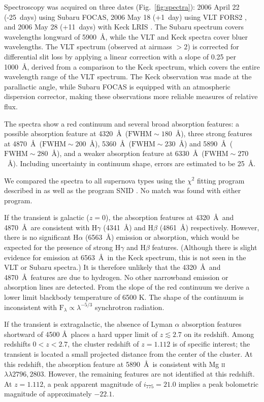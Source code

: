 Spectroscopy was acquired on three dates (Fig.~\ref{fig:spectra}): 
2006 April 22 (-25~days) using Subaru FOCAS, 
2006 May 18 (+1~day) using VLT FORS2 \citep{appenzeller98a}, and 
2006 May 28 (+11~days) with Keck LRIS \citep{oke95a}.
The Subaru spectrum covers wavelengths longward of 5900~\AA, 
while the VLT and Keck spectra cover bluer wavelengths.
The VLT spectrum (observed at airmass $> 2$) is corrected for differential 
slit loss by applying a linear correction with a slope of 0.25 per 1000~\AA, 
derived from a comparison to the Keck spectrum, which covers the 
entire wavelength range of the VLT spectrum.
The Keck observation was made at the parallactic angle, 
while Subaru FOCAS is equipped with an atmospheric dispersion corrector,
making these observations more reliable measures of relative flux.

The spectra show a red continuum and several broad absorption features: 
a possible absorption feature at 4320~\AA\ ($\mathrm{FWHM} \sim 180$~\AA), 
three strong features at 4870~\AA\ ($\mathrm{FWHM} \sim 200$~\AA), 
5360~\AA\ ($\mathrm{FWHM} \sim 230$~\AA) and 5890~\AA\ 
($\mathrm{FWHM} \sim 280$~\AA), 
and a weaker absorption feature at 6330~\AA\ ($\mathrm{FWHM} \sim 270$~\AA). 
Including uncertainty in continuum shape, errors are estimated to be 25~\AA.

We compared the spectra to all supernova types using the $\chi^2$ fitting 
program described in \citet{howell05a} as well as the program SNID 
\citep{blondin07a}. No match was found with either program.

If the transient is galactic ($z=0$),
the absorption features at 4320~\AA\ and 4870~\AA\ are consistent with
$\mathrm{H}\gamma$ (4341~\AA) and $\mathrm{H}\beta$ (4861~\AA) respectively.
However, there is no significant $\mathrm{H}\alpha$ (6563~\AA) emission or 
absorption, which would be expected for the presence of strong 
$\mathrm{H}\gamma$ and $\mathrm{H}\beta$ features. (Although there is 
slight evidence for emission at 6563~\AA\ in the 
Keck spectrum, this is not seen in the VLT or Subaru spectra.)
It is therefore unlikely that the 4320~\AA\ and 4870~\AA\ features are 
due to hydrogen.
No other narrowband emission or absorption lines are detected.
From the slope of the red continuum we derive a lower limit blackbody 
temperature of 6500 K. The shape of the continuum is inconsistent with 
$\mathrm{F}_\lambda \propto \lambda^{-5/3}$ synchrotron radiation. 

If the transient is extragalactic, the absence of Lyman $\alpha$ absorption 
features shortward of 4500 \AA\ places a hard upper limit of $z \lesssim 2.7$ on 
its redshift. Among redshifts $0 < z < 2.7$, the cluster redshift of 
$z = 1.112$ is of specific interest;
the transient is located a small projected distance from the center of the 
cluster. At this redshift,
the absorption feature at 5890~\AA\ is consistent with Mg \textsc{ii}
$\lambda\lambda2796,2803$. However, the remaining features are not identified 
at this redshift. At $z = 1.112$, a peak apparent magnitude of 
$i_{775} = 21.0$ implies a peak bolometric magnitude of approximately $-22.1$.

